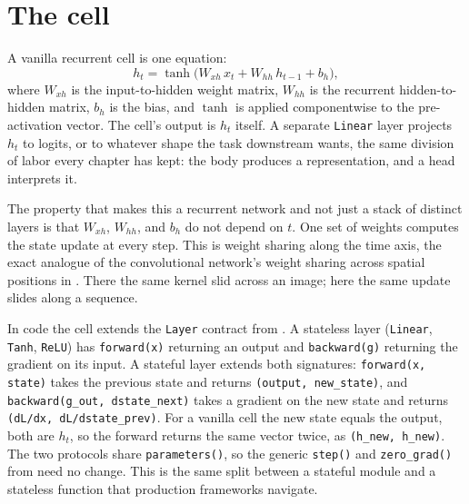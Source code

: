 \section{The cell}\label{sec:rnn-cell}

A vanilla recurrent cell is one equation:
\[
  h_t = \tanh\!\bigl(W_{xh}\, x_t + W_{hh}\, h_{t-1} + b_h\bigr),
\]
where $W_{xh}$ is the input-to-hidden weight matrix, $W_{hh}$ is the
recurrent hidden-to-hidden matrix, $b_h$ is the bias, and $\tanh$ is applied
componentwise to the pre-activation vector. The cell's output is $h_t$
itself. A separate \texttt{Linear} layer projects $h_t$ to logits, or to
whatever shape the task downstream wants, the same division of labor every
chapter has kept: the body produces a representation, and a head interprets
it.

The property that makes this a recurrent network and not just a stack of
distinct layers is that $W_{xh}$, $W_{hh}$, and $b_h$ do not depend on $t$.
One set of weights computes the state update at every step. This is weight
sharing along the time axis, the exact analogue of the convolutional
network's weight sharing across spatial positions in . There
the same kernel slid across an image; here the same update slides along a
sequence.

In code the cell extends the \texttt{Layer} contract from
. A stateless layer (\texttt{Linear}, \texttt{Tanh},
\texttt{ReLU}) has \texttt{forward(x)} returning an output and
\texttt{backward(g)} returning the gradient on its input. A stateful layer
extends both signatures: \texttt{forward(x, state)} takes the previous state
and returns \texttt{(output, new\_state)}, and \texttt{backward(g\_out,
dstate\_next)} takes a gradient on the new state and returns
\texttt{(dL/dx, dL/dstate\_prev)}. For a vanilla cell the new state equals
the output, both are $h_t$, so the forward returns the same vector twice, as
\texttt{(h\_new, h\_new)}. The two protocols share \texttt{parameters()},
so the generic \texttt{step()} and \texttt{zero\_grad()} from
 need no change. This is the same split between a
stateful module and a stateless function that production frameworks
navigate.

